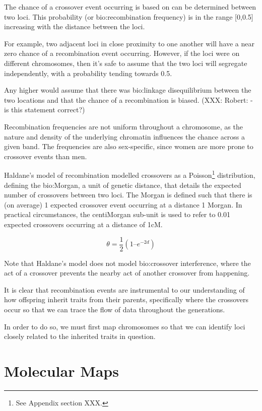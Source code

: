 The chance of a crossover event occurring is based on can be determined between two loci. This probability (or \gls{bio:recombination  frequency}) is in the range [0,0.5] increasing with the distance between the loci.

For example,  two adjacent loci in close proximity to one another will have a near zero chance of a recombination event occurring. However, if the loci were on different chromosomes, then it's safe to assume that the two loci will segregate independently, with a probability tending towards 0.5.

Any higher would assume that there was \gls{bio:linkage disequilibrium} between the two locations and that the chance of a recombination is biased. (XXX: Robert: - is this statement correct?)

Recombination frequencies are not uniform throughout a chromosome, as the nature and density of the underlying chromatin influences the chance across a given band. The frequencies are also sex-specific, since women are more prone to crossover events than men.

Haldane's model of recombination modelled crossovers as a Poisson\footnote{See Appendix section XXX.} distribution, defining the \gls{bio:Morgan}, a unit of genetic distance, that details the expected number of crossovers between two loci. The Morgan is defined such that there is (on average) 1 expected crossover event occurring at a distance 1 Morgan.  In practical circumstances, the centiMorgan sub-unit is used to refer to 0.01 expected crossovers occurring at a distance of 1cM. 

\begin{equation}
\theta = \frac{1}{2} (1 –  e^{-2d})
\label{eqn:morgan}
\end{equation}

Note that Haldane’s model does not model \gls{bio:crossover interference}, where the act of a crossover prevents the nearby act of another crossover from happening. 

It is clear that recombination events are instrumental to our understanding of how offspring inherit traits from their parents, specifically where the crossovers occur so that we can trace the flow of data throughout the generations.

In order to do so, we must first map chromosomes so that we can identify loci closely related to the inherited traits in question. 

\section{Molecular Maps}

